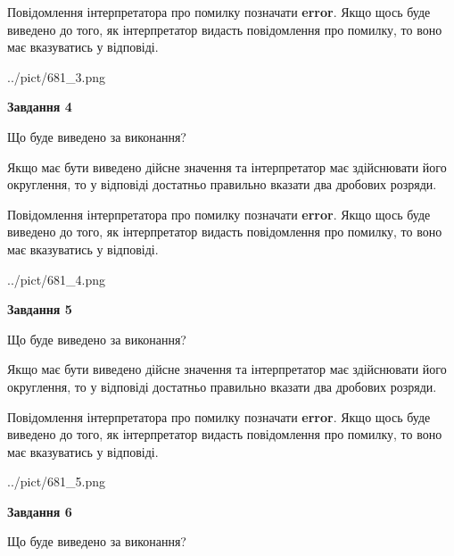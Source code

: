 \documentclass[12pt, ukrainian]{article}
\begin{document}
{\begin {Large}
Повідомлення інтерпретатора про помилку позначати \textbf{error}.
Якщо щось буде виведено до того, як інтерпретатор видасть повідомлення про помилку, 
то воно має вказуватись у відповіді. \par

\begin{center}
	{../pict/681_3.png}
\end{center}
\newpage

{\begin {center}\textbf{Завдання 4}\end {center}}\par
Що буде виведено за виконання? \par

Якщо має бути виведено дійсне значення та інтерпретатор має здійснювати його округлення, 
то у відповіді достатньо правильно вказати два дробових розряди.

Повідомлення інтерпретатора про помилку позначати \textbf{error}.
Якщо щось буде виведено до того, як інтерпретатор видасть повідомлення про помилку, 
то воно має вказуватись у відповіді. \par

\begin{center}
	{../pict/681_4.png}
\end{center}
\newpage

{\begin {center}\textbf{Завдання 5}\end {center}}\par
Що буде виведено за виконання? \par

Якщо має бути виведено дійсне значення та інтерпретатор має здійснювати його округлення, 
то у відповіді достатньо правильно вказати два дробових розряди.

Повідомлення інтерпретатора про помилку позначати \textbf{error}.
Якщо щось буде виведено до того, як інтерпретатор видасть повідомлення про помилку, 
то воно має вказуватись у відповіді. \par

\begin{center}
	{../pict/681_5.png}
\end{center}
\newpage

{\begin {center}\textbf{Завдання 6}\end {center}}\par
Що буде виведено за виконання? \par


\end{Large}}
\end{document}
